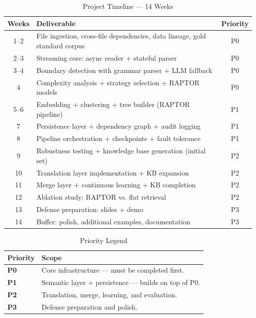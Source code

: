 \documentclass[11pt,a4paper]{article}
\begin{document}
\begin{table}[H]
\centering
\caption{Project Timeline — 14 Weeks}
\renewcommand{\arraystretch}{1.3}
\small
\begin{tabularx}{\textwidth}{@{} c X c @{}}
\toprule
\textbf{Weeks} & \textbf{Deliverable} & \textbf{Priority} \\
\midrule
\rowcolor{successgreen!8} 1–2 & File ingestion, cross-file dependencies, data lineage, gold standard corpus & P0 \\
\rowcolor{successgreen!8} 2–3 & Streaming core: async reader + stateful parser & P0 \\
\rowcolor{successgreen!8} 3–4 & Boundary detection with grammar parser + LLM fallback & P0 \\
\rowcolor{successgreen!8} 4 & Complexity analysis + strategy selection + RAPTOR models & P0 \\
\rowcolor{warncolor!8} 5–6 & Embedding + clustering + tree builder (RAPTOR pipeline) & P1 \\
\rowcolor{warncolor!8} 7 & Persistence layer + dependency graph + audit logging & P1 \\
\rowcolor{warncolor!8} 8 & Pipeline orchestration + checkpoints + fault tolerance & P1 \\
9 & Robustness testing + knowledge base generation (initial set) & P2 \\
10 & Translation layer implementation + KB expansion & P2 \\
11 & Merge layer + continuous learning + KB completion & P2 \\
12 & Ablation study: RAPTOR vs. flat retrieval & P2 \\
\rowcolor{lightbg} 13 & Defense preparation: slides + demo & P3 \\
\rowcolor{lightbg} 14 & Buffer: polish, additional examples, documentation & P3 \\
\bottomrule
\end{tabularx}
\end{table}

\begin{table}[H]
\centering
\caption{Priority Legend}
\renewcommand{\arraystretch}{1.2}
\begin{tabularx}{\textwidth}{@{} l X @{}}
\toprule
\textbf{Priority} & \textbf{Scope} \\
\midrule
\rowcolor{successgreen!8} \textbf{P0} & Core infrastructure — must be completed first. \\
\rowcolor{warncolor!8} \textbf{P1} & Semantic layer + persistence — builds on top of P0. \\
\textbf{P2} & Translation, merge, learning, and evaluation. \\
\rowcolor{lightbg} \textbf{P3} & Defense preparation and polish. \\
\bottomrule
\end{tabularx}
\end{table}
\end{document}
